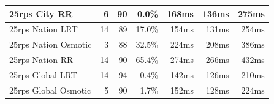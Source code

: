 \documentclass[draft,final]{vutinfth} %
\begin{document}
\begin{table}[]
\begin{tabular}{lrrrrrr}
25rps City RR        & 6                                                              & 90                                                                                        & 0.0\%                                                                         & 168ms                                                       & 136ms                                                         & 275ms                                                      \\ \hline
25rps Nation LRT     & 14                                                             & 89                                                                                        & 17.0\%                                                                        & 154ms                                                       & 131ms                                                         & 254ms                                                      \\
25rps Nation Osmotic & 3                                                              & 88                                                                                        & 32.5\%                                                                        & 224ms                                                       & 208ms                                                         & 386ms                                                      \\
25rps Nation RR      & 14                                                             & 90                                                                                        & 65.4\%                                                                        & 274ms                                                       & 266ms                                                         & 432ms                                                      \\ \hline
25rps Global LRT     & 14                                                             & 94                                                                                        & 0.4\%                                                                         & 142ms                                                       & 126ms                                                         & 210ms                                                      \\
25rps Global Osmotic & 5                                                              & 90                                                                                        & 1.7\%                                                                         & 152ms                                                       & 128ms                                                         & 224ms                                                      \\

\end{tabular}
\end{table}
\end{document}
